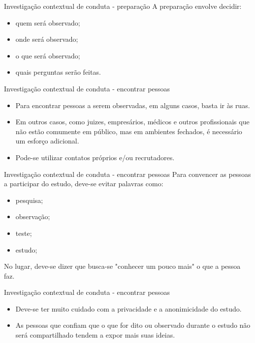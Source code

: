 \documentclass[11pt]{beamer}
\begin{document}
   \begin{frame}{Investigação contextual de conduta - preparação}
      A preparação envolve decidir:
      \begin{itemize}
         \item quem será observado;
         \item onde será observado;
         \item o que será observado;
         \item quais perguntas serão feitas.
      \end{itemize}
   \end{frame}

   \begin{frame}{Investigação contextual de conduta - encontrar pessoas}
      \begin{itemize}
         \item Para encontrar pessoas a serem observadas, em alguns casos, basta ir às ruas.
         \item Em outros casos, como juizes, empresários, médicos e outros profissionais que não estão comumente em público, mas em ambientes fechados, é necessário um esforço adicional.
         \item Pode-se utilizar contatos próprios e/ou recrutadores.
      \end{itemize}
   \end{frame}

   \begin{frame}{Investigação contextual de conduta - encontrar pessoas}
      Para convencer as pessoas a participar do estudo, deve-se evitar palavras como:
      \begin{itemize}
         \item pesquisa;
         \item observação;
         \item teste;
         \item estudo;
      \end{itemize}
      No lugar, deve-se dizer que busca-se "conhecer um pouco mais" o que a pessoa faz.
   \end{frame}

   \begin{frame}{Investigação contextual de conduta - encontrar pessoas}
      \begin{itemize}
         \item Deve-se ter muito cuidado com a privacidade e a anonimicidade do estudo.
         \item As pessoas que confiam que o que for dito ou observado durante o estudo não será compartilhado tendem a expor mais suas ideias.
      \end{itemize}
   \end{frame}
\end{document}
